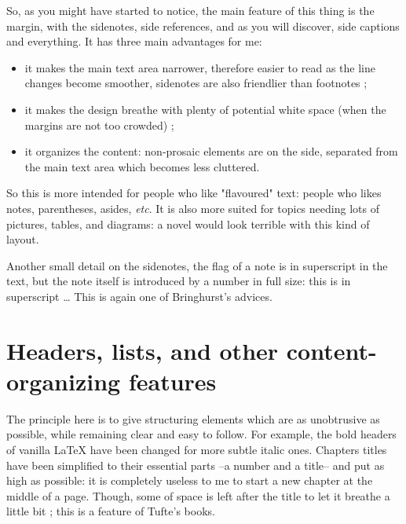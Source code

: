 \documentclass[
    11pt,
]{tufte-style-thesis}
\begin{document}
So, as you might have started to notice, the main feature of this thing is the margin, with the sidenotes, side references, and as you will discover, side captions and everything. It has three main advantages for me:
\begin{itemize}
  \item it makes the main text area narrower, therefore easier to read as the line changes become smoother, sidenotes are also friendlier than footnotes ;
  \item it makes the design breathe with plenty of potential white space (when the margins are not too crowded) ;
  \item it organizes the content: non-prosaic elements are on the side, separated from the main text area which becomes less cluttered.
\end{itemize}
So this is more intended for people who like "flavoured" text: people who likes notes, parentheses, asides, \textit{etc}. It is also more suited for topics needing lots of pictures, tables, and diagrams: a novel would look terrible with this kind of layout.

Another small detail on the sidenotes, the flag of a note is in superscript in the text, but the note itself is introduced by a number in full size: this is in superscript \dots{} This is again one of Bringhurst's advices.


\section{Headers, lists, and other content-organizing features}

The principle here is to give structuring elements which are as unobtrusive as possible, while remaining clear and easy to follow. For example, the bold headers of vanilla \LaTeX{} have been changed for more subtle italic ones. Chapters titles have been simplified to their essential parts --a number and a title-- and put as high as possible: it is completely useless to me to start a new chapter at the middle of a page. Though, some of space is left after the title to let it breathe a little bit ; this is a feature of Tufte's books.
\end{document}
